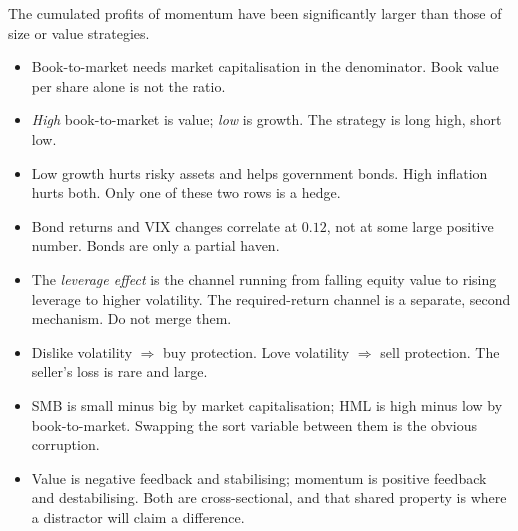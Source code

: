 \begin{imkeybox}[title={Remember}]
The cumulated profits of momentum have been significantly larger than those of
size or value strategies.
\end{imkeybox}

\begin{imtrapbox}[title={Consolidated trap summary --- IM-2}]
\begin{itemize}
\item {} Book-to-market needs market capitalisation in the
denominator. Book value per share alone is not the ratio.
\item {} \emph{High} book-to-market is value; \emph{low} is
growth. The strategy is long high, short low.
\item {} Low growth hurts risky assets and helps government
bonds. High inflation hurts both. Only one of these two rows is a hedge.
\item {} Bond returns and VIX changes correlate at $0.12$,
not at some large positive number. Bonds are only a partial haven.
\item {} The \emph{leverage effect} is the channel running
from falling equity value to rising leverage to higher volatility. The
required-return channel is a separate, second mechanism. Do not merge them.
\item {} Dislike volatility $\Rightarrow$ buy protection.
Love volatility $\Rightarrow$ sell protection. The seller's loss is rare and
large.
\item {} SMB is small minus big by market capitalisation;
HML is high minus low by book-to-market. Swapping the sort variable between them
is the obvious corruption.
\item {} Value is negative feedback and stabilising;
momentum is positive feedback and destabilising. Both are cross-sectional, and
that shared property is where a distractor will claim a difference.
\end{itemize}
\end{imtrapbox}



